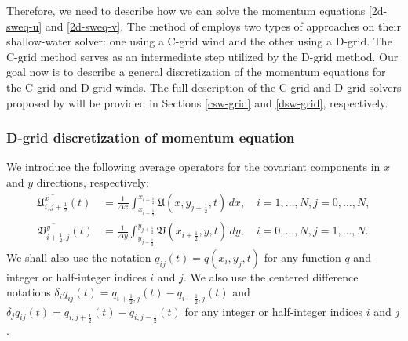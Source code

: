 Therefore, we need to describe how we can solve the momentum equations \eqref{2d-sweq-u} and \eqref{2d-sweq-v}. 
The method of \citet{lin:1997} employs two types of approaches on their shallow-water solver: one using a C-grid wind and the other using a D-grid.
The C-grid method serves as an intermediate step utilized by the D-grid method.
Our goal now is to describe a general discretization of the momentum equations for the C-grid and D-grid winds.
The full description of the C-grid and D-grid solvers proposed by 
\citet{lin:1997} will be provided in Sections \ref{csw-grid} and \ref{dsw-grid}, respectively.

\subsubsection{D-grid discretization of momentum equation }
We introduce the following average operators for the covariant components in $x$ and $y$ directions, respectively:
\begin{align}
	\label{2d-sweq-int_u}
	\overline{\mathfrak{U}^x_{i,j+\frac{1}{2}}}(t)&= \frac{1}{\Delta x} \int_{x_{i-\frac{1}{2}}}^{x_{i+\frac{1}{2}}} \mathfrak{U}(x, y_{j+\frac{1}{2}}, t) \,dx , \quad i=1,\ldots,N,j=0,\ldots, N,\\
	\label{2d-sweq-int_v}
	\overline{\mathfrak{V}^y_{i+\frac{1}{2},j}}(t)&= \frac{1}{\Delta y} \int_{y_{j-\frac{1}{2}}}^{y_{j+\frac{1}{2}}} \mathfrak{V}(x_{i+\frac{1}{2}}, y, t) \,dy,  \quad i=0,\ldots,N,j=1,\ldots, N.
\end{align}
We shall also use the notation $q_{ij}(t) = q(x_i,y_j,t)$ for any function $q$ and integer or half-integer indices $i$ and $j$.
We also use the centered difference notations $\delta _i q_{ij}(t) =q_{i+\frac{1}{2},j}(t) -q_{i-\frac{1}{2},j}(t)$ and 
$\delta _j q_{ij}(t) = q_{i,j+\frac{1}{2}}(t) -q_{i,j-\frac{1}{2}}(t)$ for any integer or half-integer indices $i$ and $j$.

